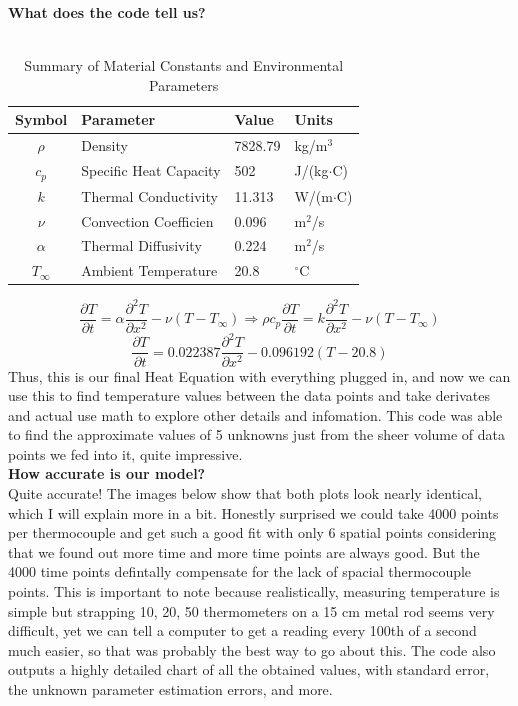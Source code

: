 \documentclass[11pt]{article}
\begin{document}
\begin{onehalfspace}
    \noindent
    \textbf{What does the code tell us?} \\\\
    \begin{table}[h!]
    \centering
    \renewcommand{\arraystretch}{1.5}
    \begin{tabular}{|c|l|l|l|}
    \hline
    \textbf{Symbol} & \textbf{Parameter} & \textbf{Value} & \textbf{Units} \\ \hline
    $\rho$ & Density & 7828.79 & kg/m$^3$ \\ \hline
    $c_p$ & Specific Heat Capacity & 502 & J/(kg$\cdot$C) \\ \hline
    $k$ & Thermal Conductivity & 11.313 & W/(m$\cdot$C) \\ \hline
    $\nu$ & Convection Coefficien & 0.096 & m$^2$/s \\ \hline
    $\alpha$ & Thermal Diffusivity & 0.224 & m$^2$/s \\ \hline
    $T_\infty$ & Ambient Temperature & 20.8 & $^\circ$C \\ \hline
    \end{tabular}
    \caption{Summary of Material Constants and Environmental Parameters}
    \label{table:material_props}
    \end{table}
    \[\frac{\partial T}{\partial t} = \alpha \frac{\partial^2 T}{\partial x^2} - \nu(T - T_\infty)
    \Longrightarrow \rho c_p \frac{\partial T}{\partial t} = k \frac{\partial^2 T}{\partial x^2} - \nu(T - T_\infty)\]
    \[\frac{\partial T}{\partial t} = 0.022387 \frac{\partial^2 T}{\partial x^2} - 0.096192(T - 20.8)\]
    Thus, this is our final Heat Equation with everything plugged in, 
    and now we can use this to find temperature values between the data points 
    and take derivates and actual use math to explore other details and infomation.
    This code was able to find the approximate values of 5 unknowns just from the sheer
    volume of data points we fed into it, quite impressive.\\
    \newpage
    \noindent
    \textbf{How accurate is our model?} \\
    Quite accurate! The images below show that both plots look nearly identical, which I will explain more in a bit.
    Honestly surprised we could take 4000 points per thermocouple and get such a good fit with only 6 spatial points
    considering that we found out more time and more time points are always good. But the 4000 time points defintally compensate for
    the lack of spacial thermocouple points. This is important to note because realistically, measuring temperature is simple
    but strapping 10, 20, 50 thermometers on a 15 cm metal rod seems very difficult, yet we can tell a computer to get a reading 
    every 100th of a second much easier, so that was probably the best way to go about this.
    The code also outputs a highly detailed chart of all the obtained values, with standard error, the unknown parameter estimation errors, and more.
    

\end{onehalfspace}
\end{document}

